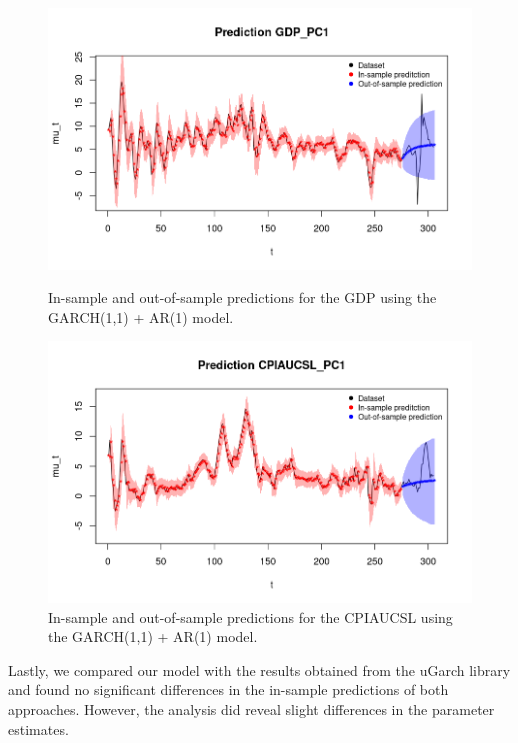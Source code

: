 \begin{figure}[H]
    \centering
    \begin{minipage}{0.49\textwidth}
        \centering
        \includegraphics[width=\textwidth]{images/5-GARCH/gdp_prediction.png}
        \caption{In-sample and out-of-sample predictions for the GDP using the GARCH(1,1) + AR(1) model.}
        \label{fig:GARCH1,1_AR1_gdp_prediction} 
    \end{minipage}\hfill
    \begin{minipage}{0.49\textwidth}
        \centering
        \includegraphics[width=\textwidth]{images/5-GARCH/infl_prediction.png}
        \caption{In-sample and out-of-sample predictions for the CPIAUCSL using the GARCH(1,1) + AR(1) model.}
        \label{fig:GARCH1,1_AR1_infl_prediction}
    \end{minipage}
\end{figure}
Lastly, we compared our model with the results obtained from the uGarch library and found no significant differences in the in-sample predictions of both approaches. However, the analysis did reveal slight differences in the parameter estimates.